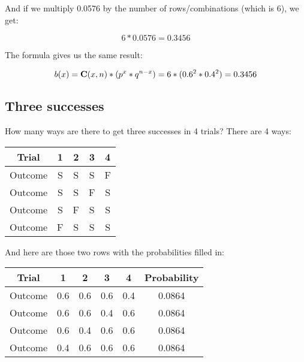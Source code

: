 \documentclass[../../../main.tex]{subfiles}
\begin{document}
\noindent
And if we multiply 0.0576 by the number of rows/combinations (which is 6), we get:

\begin{equation*}
    6 * 0.0576 = 0.3456
\end{equation*}

\noindent
The formula gives us the same result:

\begin{equation*}
  \Binom{\RandVarVal/} = \combs{\RandVarVal/}{n} * (p^{\RandVarVal/} * q^{n - \RandVarVal/}) = 6 * (0.6^{2} * 0.4^{2}) = 0.3456
\end{equation*}


\subsection{Three successes}

How many ways are there to get three successes in 4 trials? There are 4 ways:

\begin{center}
  \begin{tabular}{| c | c | c | c | c |}
    \hline
    \textbf{Trial} & \textbf{1} & \textbf{2} & \textbf{3} & \textbf{4} \\ \hline
  Outcome & S & S & S & F \\ \hline
  Outcome & S & S & F & S \\ \hline
  Outcome & S & F & S & S \\ \hline
  Outcome & F & S & S & S \\ \hline
  \end{tabular}
\end{center}

\noindent
And here are those two rows with the probabilities filled in:

\begin{center}
  \begin{tabular}{| c | c | c | c | c | c |}
    \hline
    \textbf{Trial} & \textbf{1} & \textbf{2} & \textbf{3} & \textbf{4} & \textbf{Probability} \\ \hline
  Outcome & 0.6 & 0.6 & 0.6 & 0.4 & 0.0864 \\ \hline
  Outcome & 0.6 & 0.6 & 0.4 & 0.6 & 0.0864 \\ \hline
  Outcome & 0.6 & 0.4 & 0.6 & 0.6 & 0.0864 \\ \hline
  Outcome & 0.4 & 0.6 & 0.6 & 0.6 & 0.0864 \\ \hline
  \end{tabular}
\end{center}
\end{document}
